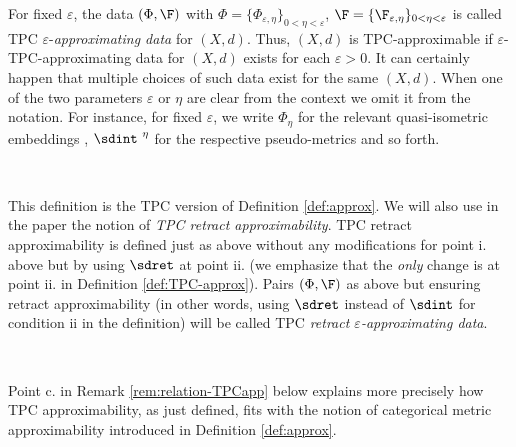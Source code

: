 For fixed
$\varepsilon$, the data $(\Phi, \F)$ with  $\Phi= \{\Phi_{\varepsilon,\eta}\}_{0<\eta <\varepsilon}$,
$\F=\{\F_{\varepsilon,\eta} \}_{0<\eta<\varepsilon}$ is called 
TPC $\varepsilon$-{\em approximating data} for $(X,d)$. Thus, $(X,d)$ is
TPC-approximable if $\varepsilon$-TPC-approximating data for $(X,d)$
exists for each $\varepsilon>0$. It can certainly happen that multiple
choices of such data exist for the same $(X,d)$. When one of the two parameters $\varepsilon$ or $\eta$ are clear from the context we omit it from the notation. For instance, for fixed $\varepsilon$, we write $\Phi_{\eta}$ for the relevant quasi-isometric embeddings , $\sdint^{\ \eta}$ for the respective pseudo-metrics and so forth. 


\

This definition  is the TPC  version of Definition \ref{def:approx}. 
We will also  use in the paper the notion of  {\em TPC retract approximability}.  TPC retract approximability is defined just as above
without any modifications for point i. above but by using $ \sdret$ at
point ii.  (we emphasize that the {\em only} change is at point ii. in
Definition \ref{def:TPC-approx}). Pairs $(\Phi, \F)$ as above but ensuring retract approximability (in other words, using $\sdret$ instead of $\sdint$ for condition ii in the definition) will be called TPC {\em retract $\varepsilon$-approximating data}.

\

Point c. in Remark \ref{rem:relation-TPCapp} below explains more precisely how  TPC  approximability, as just defined, fits with the notion of categorical metric approximability introduced in Definition \ref{def:approx}.


